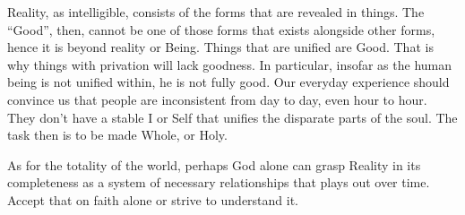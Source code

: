 Reality, as intelligible, consists of the forms that are revealed in things. The ``Good'', then, cannot be one of those forms that exists alongside other forms, hence it is beyond reality or Being. Things that are unified are Good. That is why things with privation will lack goodness. In particular, insofar as the human being is not unified within, he is not fully good. Our everyday experience should convince us that people are inconsistent from day to day, even hour to hour. They don't have a stable I or Self that unifies the disparate parts of the soul. The task then is to be made Whole, or Holy.

As for the totality of the world, perhaps God alone can grasp Reality in its completeness as a system of necessary relationships that plays out over time. Accept that on faith alone or strive to understand it.



